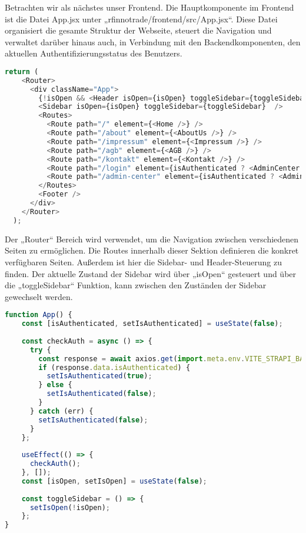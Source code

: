 Betrachten wir als nächstes unser Frontend. Die Hauptkomponente im Frontend ist die Datei App.jsx unter „rfinnotrade/frontend/src/App.jsx“. Diese Datei organisiert die gesamte Struktur der Webseite, steuert die Navigation und verwaltet darüber hinaus auch, in Verbindung mit den Backendkomponenten, den aktuellen Authentifizierungsstatus des Benutzers.

\begin{lstlisting}[language=JavaScript, caption={App.jsx Router}, label={lst:appjsxRouter}]
return (
    <Router>
      <div className="App">
        {!isOpen && <Header isOpen={isOpen} toggleSidebar={toggleSidebar} isAuthenticated={isAuthenticated} setIsAuthenticated={setIsAuthenticated} />}
        <Sidebar isOpen={isOpen} toggleSidebar={toggleSidebar}  />
        <Routes>
          <Route path="/" element={<Home />} />
          <Route path="/about" element={<AboutUs />} />
          <Route path="/impressum" element={<Impressum />} />
          <Route path="/agb" element={<AGB />} />
          <Route path="/kontakt" element={<Kontakt />} />
          <Route path="/login" element={isAuthenticated ? <AdminCenter /> : <Login onLoginSuccess={checkAuth} />} />
          <Route path="/admin-center" element={isAuthenticated ? <AdminCenter /> : <Login onLoginSuccess={checkAuth} />} />
        </Routes>
        <Footer />
      </div>
    </Router>
  );
\end{lstlisting}

Der „Router“ Bereich wird verwendet, um die Navigation zwischen verschiedenen Seiten zu ermöglichen. Die Routes innerhalb dieser Sektion definieren die konkret verfügbaren Seiten.
Außerdem ist hier die Sidebar- und Header-Steuerung zu finden. Der aktuelle Zustand der Sidebar wird über „isOpen“ gesteuert und über die „toggleSidebar“ Funktion, kann zwischen den Zuständen der Sidebar gewechselt werden.

\begin{lstlisting}[language=JavaScript, caption={App.jsx checkAuth}, label={lst:appjsxCheckAuth}]    
function App() {
    const [isAuthenticated, setIsAuthenticated] = useState(false);
  
    const checkAuth = async () => {
      try {
        const response = await axios.get(import.meta.env.VITE_STRAPI_BASE_URL + 'api/auth/status', { withCredentials: true });
        if (response.data.isAuthenticated) {
          setIsAuthenticated(true);
        } else {
          setIsAuthenticated(false);
        }
      } catch (err) {
        setIsAuthenticated(false);
      }
    };
  
    useEffect(() => {
      checkAuth();
    }, []);
    const [isOpen, setIsOpen] = useState(false);
  
    const toggleSidebar = () => {
      setIsOpen(!isOpen);
    };
}
\end{lstlisting}

